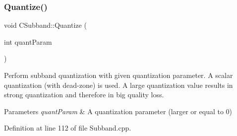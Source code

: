 \mbox{\label{classCSubband_a5de71c37eb00e5e5dad3fe5e38b81ced}} 
\subsubsection{\texorpdfstring{Quantize()}{Quantize()}}
{\footnotesize\ttfamily void C\+Subband\+::\+Quantize (\begin{DoxyParamCaption}\item[{int}]{quant\+Param }\end{DoxyParamCaption})}

Perform subband quantization with given quantization parameter. A scalar quantization (with dead-\/zone) is used. A large quantization value results in strong quantization and therefore in big quality loss. 
\begin{DoxyParams}{Parameters}
{\em quant\+Param} & A quantization parameter (larger or equal to 0) \\
\hline
\end{DoxyParams}


Definition at line 112 of file Subband.\+cpp.


